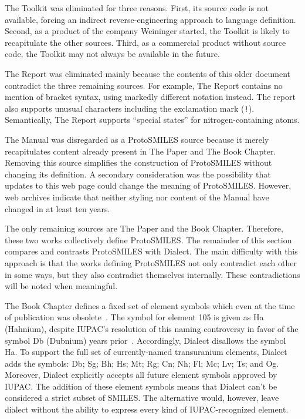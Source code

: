 \documentclass{article}
\def\ttt{\texttt}
\begin{document}
The Toolkit was eliminated for three reasons. First, its source code is not available, forcing an indirect reverse-engineering approach to language definition. Second, as a product of the company Weininger started, the Toolkit is likely to recapitulate the other sources. Third, as a commercial product without source code, the Toolkit may not always be available in the future.

The Report was eliminated mainly because the contents of this older document contradict the three remaining sources. For example, The Report contains no mention of bracket syntax, using markedly different notation instead. The report also supports unusual characters including the exclamation mark (\ttt{!}). Semantically, The Report supports \enquote{special states} for nitrogen-containing atoms.

The Manual was disregarded as a ProtoSMILES source because it merely recapitulates content already present in The Paper and The Book Chapter. Removing this source simplifies the construction of ProtoSMILES without changing its definition. A secondary consideration was the possibility that updates to this web page could change the meaning of ProtoSMILES. However, web archives indicate that neither styling nor content of the Manual have changed in at least ten years.

The only remaining sources are The Paper and the Book Chapter. Therefore, these two works collectively define ProtoSMILES. The remainder of this section compares and contrasts ProtoSMILES with Dialect. The main difficulty with this approach is that the works defining ProtoSMILES not only contradict each other in some ways, but they also contradict themselves internally. These contradictions will be noted when meaningful.

The Book Chapter defines a fixed set of element symbols which even at the time of publication was obsolete~\cite[p.~83]{weininger:2003}. The symbol for element 105 is given as Ha (Hahnium), despite IUPAC's resolution of this naming controversy in favor of the symbol Db (Dubnium) years prior~\cite{sageson:1997}. Accordingly, Dialect disallows the symbol Ha. To support the full set of currently-named transuranium elements, Dialect adds the symbols: Db; Sg; Bh; Hs; Mt; Rg; Cn; Nh; Fl; Mc; Lv; Ts; and Og. Moreover, Dialect explicitly accepts all future element symbols approved by IUPAC. The addition of these element symbols means that Dialect can't be considered a strict subset of SMILES. The alternative would, however, leave dialect without the ability to express every kind of IUPAC-recognized element.
\end{document}
